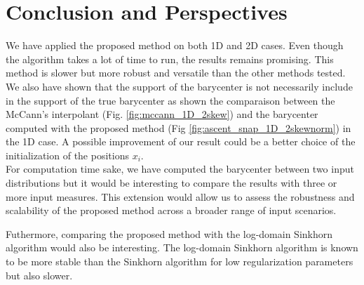 \section{Conclusion and Perspectives}

We have applied the proposed method on both 1D and 2D cases. Even though the algorithm takes a lot of time to run, the results remains promising. This method is slower but more robust and versatile than the other methods tested. 
We also have shown that the support of the barycenter is not necessarily include in the support of the true barycenter as shown the comparaison between the McCann's interpolant (Fig. \ref{fig:mccann_1D_2skew}) and the barycenter computed with the proposed method (Fig \ref{fig:ascent_snap_1D_2skewnorm}) in the 1D case. A possible improvement of our result could be a better choice of the initialization of the positions $x_i$. \\ 

For computation time sake, we have computed the barycenter between two input distributions but it would be interesting to compare the results with three or more input measures. This extension would allow us to assess the robustness and scalability of the proposed method across a broader range of input scenarios. 

Futhermore, comparing the proposed method with the log-domain Sinkhorn algorithm would also be interesting. The log-domain Sinkhorn algorithm is known to be more stable than the Sinkhorn algorithm for low regularization parameters but also slower.
